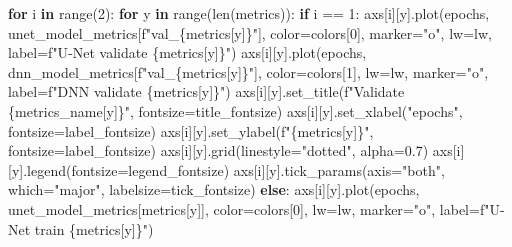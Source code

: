 \documentclass[
  letterpaper,
  DIV=11,
  numbers=noendperiod]{scrreprt}
\newenvironment{Shaded}{\begin{snugshade}}{\end{snugshade}}
\newcommand{\BuiltInTok}[1]{\textcolor[rgb]{0.00,0.23,0.31}{#1}}
\newcommand{\ControlFlowTok}[1]{\textcolor[rgb]{0.00,0.23,0.31}{\textbf{#1}}}
\newcommand{\DecValTok}[1]{\textcolor[rgb]{0.68,0.00,0.00}{#1}}
\newcommand{\FloatTok}[1]{\textcolor[rgb]{0.68,0.00,0.00}{#1}}
\newcommand{\KeywordTok}[1]{\textcolor[rgb]{0.00,0.23,0.31}{\textbf{#1}}}
\newcommand{\NormalTok}[1]{\textcolor[rgb]{0.00,0.23,0.31}{#1}}
\newcommand{\OperatorTok}[1]{\textcolor[rgb]{0.37,0.37,0.37}{#1}}
\newcommand{\SpecialCharTok}[1]{\textcolor[rgb]{0.37,0.37,0.37}{#1}}
\newcommand{\SpecialStringTok}[1]{\textcolor[rgb]{0.13,0.47,0.30}{#1}}
\newcommand{\StringTok}[1]{\textcolor[rgb]{0.13,0.47,0.30}{#1}}
\begin{document}
\begin{Shaded}
\begin{Highlighting}[]
\ControlFlowTok{for}\NormalTok{ i }\KeywordTok{in} \BuiltInTok{range}\NormalTok{(}\DecValTok{2}\NormalTok{):}
    \ControlFlowTok{for}\NormalTok{ y }\KeywordTok{in} \BuiltInTok{range}\NormalTok{(}\BuiltInTok{len}\NormalTok{(metrics)):}
        \ControlFlowTok{if}\NormalTok{ i }\OperatorTok{==} \DecValTok{1}\NormalTok{:}
\NormalTok{            axs[i][y].plot(epochs, unet\_model\_metrics[}\SpecialStringTok{f"val\_}\SpecialCharTok{\{}\NormalTok{metrics[y]}\SpecialCharTok{\}}\SpecialStringTok{"}\NormalTok{], color}\OperatorTok{=}\NormalTok{colors[}\DecValTok{0}\NormalTok{], marker}\OperatorTok{=}\StringTok{"o"}\NormalTok{, lw}\OperatorTok{=}\NormalTok{lw, label}\OperatorTok{=}\SpecialStringTok{f"U{-}Net validate }\SpecialCharTok{\{}\NormalTok{metrics[y]}\SpecialCharTok{\}}\SpecialStringTok{"}\NormalTok{)}
\NormalTok{            axs[i][y].plot(epochs, dnn\_model\_metrics[}\SpecialStringTok{f"val\_}\SpecialCharTok{\{}\NormalTok{metrics[y]}\SpecialCharTok{\}}\SpecialStringTok{"}\NormalTok{], color}\OperatorTok{=}\NormalTok{colors[}\DecValTok{1}\NormalTok{], lw}\OperatorTok{=}\NormalTok{lw, marker}\OperatorTok{=}\StringTok{"o"}\NormalTok{, label}\OperatorTok{=}\SpecialStringTok{f"DNN validate }\SpecialCharTok{\{}\NormalTok{metrics[y]}\SpecialCharTok{\}}\SpecialStringTok{"}\NormalTok{)}
\NormalTok{            axs[i][y].set\_title(}\SpecialStringTok{f"Validate }\SpecialCharTok{\{}\NormalTok{metrics\_name[y]}\SpecialCharTok{\}}\SpecialStringTok{"}\NormalTok{, fontsize}\OperatorTok{=}\NormalTok{title\_fontsize)}
\NormalTok{            axs[i][y].set\_xlabel(}\StringTok{"epochs"}\NormalTok{, fontsize}\OperatorTok{=}\NormalTok{label\_fontsize)}
\NormalTok{            axs[i][y].set\_ylabel(}\SpecialStringTok{f"}\SpecialCharTok{\{}\NormalTok{metrics[y]}\SpecialCharTok{\}}\SpecialStringTok{"}\NormalTok{, fontsize}\OperatorTok{=}\NormalTok{label\_fontsize)}
\NormalTok{            axs[i][y].grid(linestyle}\OperatorTok{=}\StringTok{"dotted"}\NormalTok{, alpha}\OperatorTok{=}\FloatTok{0.7}\NormalTok{)}
\NormalTok{            axs[i][y].legend(fontsize}\OperatorTok{=}\NormalTok{legend\_fontsize)}
\NormalTok{            axs[i][y].tick\_params(axis}\OperatorTok{=}\StringTok{"both"}\NormalTok{, which}\OperatorTok{=}\StringTok{"major"}\NormalTok{, labelsize}\OperatorTok{=}\NormalTok{tick\_fontsize)}
        \ControlFlowTok{else}\NormalTok{:}
\NormalTok{            axs[i][y].plot(epochs, unet\_model\_metrics[metrics[y]], color}\OperatorTok{=}\NormalTok{colors[}\DecValTok{0}\NormalTok{], lw}\OperatorTok{=}\NormalTok{lw, marker}\OperatorTok{=}\StringTok{"o"}\NormalTok{, label}\OperatorTok{=}\SpecialStringTok{f"U{-}Net train }\SpecialCharTok{\{}\NormalTok{metrics[y]}\SpecialCharTok{\}}\SpecialStringTok{"}\NormalTok{)}

\end{Highlighting}
\end{Shaded}
\end{document}

